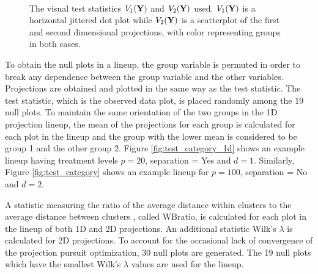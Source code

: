 \begin{figure}[htbp]
\centering
\mbox{\quad
{}}
\caption{The visual test statistics $V_1({\mbox{\boldmath {\bf Y}}})$ and $V_2({\mbox{\boldmath {\bf Y}}})$ used.  $V_1({\mbox{\boldmath {\bf Y}}})$ is a horizontal jittered dot plot while $V_2({\mbox{\boldmath {\bf Y}}})$ is a scatterplot of the first and second dimensional projections, with color representing groups in both cases. } 
\label{fig3}
\end{figure}

To obtain the null plots in a lineup, the group variable is permuted in order to break any dependence between the group variable and the other variables. Projections are obtained and plotted in the same way as the test statistic. The test statistic, which is the observed data plot, is placed randomly among the 19 null plots. To maintain the same orientation of the two groups in the 1D projection lineup,  the mean of the projections for each group is calculated for each plot in the lineup and the group with the lower mean is considered to be group 1 and the other group 2. Figure \ref{fig:test_category_1d} shows an example lineup having treatment levels $p = 20$, separation = Yes and $d = 1$. Similarly, Figure \ref{fig:test_category} shows an example lineup for $p =100$, separation = No and $d = 2$.

A statistic measuring the ratio of the average distance within clusters to the average distance between clusters \citep{hennig:2010}, called WBratio, is calculated for each plot in the lineup of both 1D and 2D projections. An additional statistic Wilk's $\lambda$ \citep[e.g.][]{JW02} is calculated for 2D projections. To account for the occasional lack of convergence of the projection pursuit optimization, 30 null plots are generated. The 19 null plots which have the smallest Wilk's $\lambda$ values are used for the lineup. 

